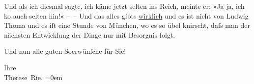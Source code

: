 \pstart
           Und als ich diesmal sagte, ich käme jetzt selten ins Reich, meinte er: »Ja ja, ich ko{\geminationm} auch selten
               hin!« – – Und das alles gibts \uline{wirklich} und es ist
               nicht von Ludwig Thoma und es iſt eine Stunde
               von München, wo {\pb}es so
               übel knirscht, daſs man der nächsten Entwicklung der Dinge nur mit Besorgnis
               folgt.\pend
           
\pstart
           Und nun alle guten So{\geminationm}erwünſche für Sie!\pend
           
\pstart
           Ihre{\\[\baselineskip]}\spacefill\mbox{Therese Rie.}\pend
           \leftskip=0em{}\endnumbering{}  
      